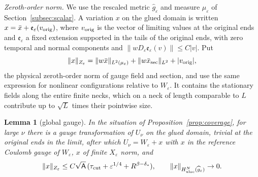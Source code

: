 \documentclass[11pt]{amsart}
\newtheorem{lemma}[theorem]{Lemma}
\theoremstyle{definition}
\theoremstyle{remark}
\theoremstyle{plain}
\numberwithin{equation}{section}
\newcommand{\eps}{\varepsilon}
\begin{document}
\emph{Zeroth-order norm.} We use the rescaled metric $\widehat g_\eps$ and measure $\mu_\eps$ of Section~\ref{subsec:scalar}. A variation $x$ on the glued domain is written $x=\bar x+\mathfrak e_\eps(v_{\rm orig})$, where $v_{\rm orig}$ is the vector of limiting values at the original
ends and $\mathfrak e_\eps$ a fixed extension supported in the tails of the original ends, with zero
temporal and normal components and $\|wD_\eps \mathfrak e_\eps(v)\|\le C|v|$. Put
\[
\|x\|_{Z_\eps}=\|w\bar x\|_{L^2(\mu_\eps)}+\|w\bar x_{\rm sec}\|_{L^2}+|v_{\rm orig}|,
\]
the physical zeroth-order norm of gauge field and section, and use the same
expression for nonlinear configurations relative to $W_\eps$. It contains the
stationary fields along the entire finite necks, which on a neck of length
comparable to $L$ contribute up to $\sqrt L$ times their pointwise size.

\begin{lemma}[global gauge]\label{lem:global-gauge}
In the situation of Proposition~\ref{prop:coverage}, for large $\nu$ there is
a gauge transformation of $U_\nu$ on the glued domain, trivial at the
original ends in the limit, after which $U_\nu=W_\eps+x$ with $x$ in the
reference Coulomb gauge of $W_\eps$, $x$ of finite $X_\eps$ norm, and
\[
\|x\|_{Z_\eps}\le C\sqrt{\mathsf A}\,(\tau_{\rm cut}+\eps^{1/4}+R^{\beta-\delta_*}),\qquad
\|x\|_{H^N_{\rm uloc}(\widehat g_\eps)}\to0 .
\]
\end{lemma}
\end{document}
